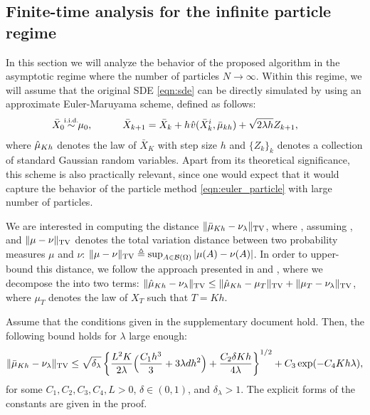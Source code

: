 
\subsection{Finite-time analysis for the infinite particle regime}



In this section we will analyze the behavior of the proposed algorithm in the asymptotic regime where the number of particles $N \rightarrow \infty$. Within this regime, we will assume that the original SDE \eqref{eqn:sde} can be directly simulated by using an approximate Euler-Maruyama scheme, defined as follows:
\begin{align}
\bar{X}_0 \simiid \mu_0, \quad \qquad \bar{X}_{k+1} = \bar{X}_k + h \hspace{0.5pt} \hat{v}(\bar{X}^i_k, \bar{\mu}_{kh} ) + \sqrt{2 \lambda h} Z_{k+1}, \qquad
\end{align}
where $\hat{\mu}_{Kh}$ denotes the law of $\bar{X}_K$ with step size $h$ and $\{Z_k\}_{k}$ denotes a collection of standard Gaussian random variables. Apart from its theoretical significance, this scheme is also practically relevant, since one would expect that it would capture the behavior of the particle method \eqref{eqn:euler_particle} with large number of particles. 

We are interested in computing the distance $\| \bar{\mu}_{Kh} - \nu_\lambda \|_{\textnormal{TV}}$, where , assuming , and $\|\mu-\nu\|_{\textnormal{TV}}$ denotes the total variation distance between two probability measures $\mu$ and $\nu$: $\|\mu-\nu\|_{\textnormal{TV}}\triangleq \sup_{A \in {\cal B}(\Omega)} |\mu(A) -\nu(A) |$. In order to upper-bound this distance, we follow the approach presented in \cite{dalalyan2017theoretical} and \cite{raginsky17a}, where we decompose the into two terms: $\| \hat{\mu}_{Kh} - \nu_\lambda \|_{\textnormal{TV}} \leq \| \hat{\mu}_{Kh} - \mu_T \|_{\textnormal{TV}} + \| \mu_{T} - \nu_\lambda \|_{\textnormal{TV}}$, where $\mu_T$ denotes the law of $X_T$ such that $T=Kh$.



\begin{thm}
\label{thm:euler}
Assume that the conditions given in the supplementary document hold. Then, the following bound holds for $\lambda$ large enough:
\begin{align}
\| \bar{\mu}_{Kh} - \nu_\lambda \|_{\textnormal{TV}} \leq \sqrt{\delta_\lambda} \left \lbrace  \frac{L^2 K}{2\lambda} \Bigl( \frac{C_1 h^3}{3} + 3 \lambda d h^2 \Bigr) + \frac{C_2  \delta K h}{4\lambda} \right \rbrace^{1/2} +  C_3 \exp(-C_4 Kh \lambda),
\end{align}
for some $C_1,C_2,C_3,C_4,L >0$, $\delta \in (0,1)$, and $\delta_\lambda >1$. The explicit forms of the constants are given in the proof.
\end{thm}

